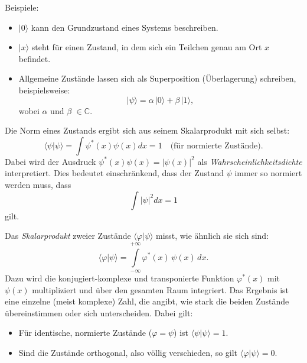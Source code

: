 		Beispiele:
		\begin{itemize}
		\item $|0\rangle$ kann den Grundzustand eines Systems beschreiben.
		\item $|x\rangle$ steht für einen Zustand, in dem sich ein Teilchen genau am Ort $x$ befindet.
		\item Allgemeine Zustände lassen sich als Superposition (Überlagerung) schreiben, beispielsweise:
		\[
			|\psi\rangle = \alpha\,|0\rangle + \beta\,|1\rangle,
		\]
		wobei $\alpha$ und $\beta$ $\in \mathbb{C}$.
		\end{itemize}

		Die Norm eines Zustands ergibt sich aus seinem Skalarprodukt mit sich selbst:
		\begin{equation}\label{fourier:equation:normEinesZustands}
			\langle \psi | \psi \rangle = \int \psi^*(x)\psi(x)dx = 1 \quad \text{(für normierte Zustände)}.
		\end{equation}
		Dabei wird der Ausdruck $\psi^*(x)\psi(x) = |\psi(x)|^2$ als \emph{Wahrscheinlichkeitsdichte} interpretiert.
		Dies bedeutet einschränkend, dass der Zustand $\psi$ immer so normiert werden muss, dass
		\begin{equation}
			\int |\psi|^2 dx = 1
		\end{equation}
		gilt.

		Das \emph{Skalarprodukt} zweier Zustände $\langle \varphi | \psi \rangle$ misst, wie ähnlich sie sich sind:
		\begin{equation}
		\langle \varphi | \psi \rangle = \int\limits_{-\infty}^{+\infty} \varphi^*(x)\,\psi(x)\,dx.
		\end{equation}
		Dazu wird die konjugiert-komplexe und transponierte Funktion $\varphi^*(x)$ mit $\psi(x)$ multipliziert und über den gesamten Raum integriert.
		Das Ergebnis ist eine einzelne (meist komplexe) Zahl, die angibt, wie stark die beiden Zustände übereinstimmen oder sich unterscheiden. 
		Dabei gilt:
		\begin{itemize}
			\item Für identische, normierte Zustände ($\varphi = \psi$) ist $\langle \psi | \psi \rangle = 1$.
			\item Sind die Zustände orthogonal, also völlig verschieden, so gilt $\langle \varphi | \psi \rangle  = 0$.
		\end{itemize}
	
